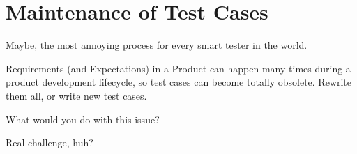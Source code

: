 \section{Maintenance of Test Cases}
\label{sec:Maintenance of Test Cases}

Maybe, the most annoying process for every smart tester in the world.

Requirements (and Expectations) in a Product can happen many times during a product development lifecycle, so test cases can become totally obsolete. Rewrite them all, or write new test cases.

What would you do with this issue?

Real challenge, huh?
